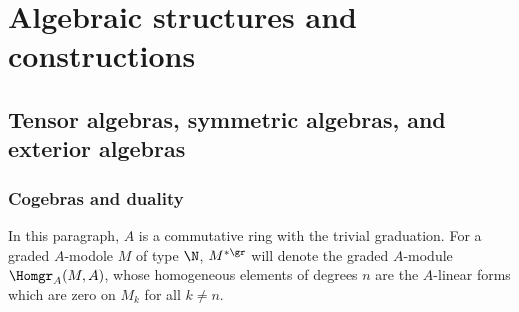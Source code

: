 \chapter{Algebraic structures and constructions}
\section{Tensor algebras, symmetric algebras, and exterior algebras}
\subsection{Cogebras and duality}
In this paragraph, $A$ is a commutative ring with the trivial graduation. For a graded $A$-modole $M$ of type $\N$, $M^{*\gr}$ will denote the graded $A$-module $\Homgr_A(M,A)$, whose homogeneous elements of degrees $n$ are the $A$-linear forms which are zero on $M_k$ for all $k\neq n$.
